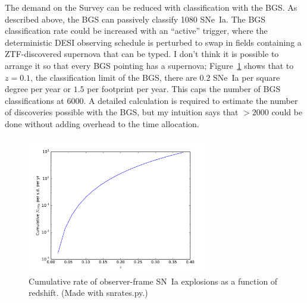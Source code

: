 \documentclass{article}   	%
\begin{document}
The demand on the Survey can be reduced with classification with the BGS.  As described above, the BGS can passively
classify 1080 SNe~Ia.  The BGS classification rate could be increased with an
``active'' trigger, where the deterministic DESI observing schedule is perturbed to swap in fields containing
a ZTF-discovered
supernova that can be typed.
I don't think it is possible to arrange it so that every BGS pointing has a supernova; Figure~\ref{total:fig} shows that 
to $z=0.1$, the classification limit of the BGS, there are $0.2$ SNe~Ia per square degree per year or $1.5$ per footprint per year.
This caps the number of BGS classifications at 6000.  A detailed calculation is required to estimate the number of discoveries
possible with the BGS, but my intuition says that $>2000$ could be done without adding overhead to the time allocation.



\color{black}

\begin{figure}[h]
\includegraphics[width=8cm]{../src/total.pdf}
\centering
\caption{Cumulative rate of observer-frame SN~Ia explosions as a function of redshift. 
(Made with snrates.py.)
\label{total:fig}}
\end{figure}
\end{document}
